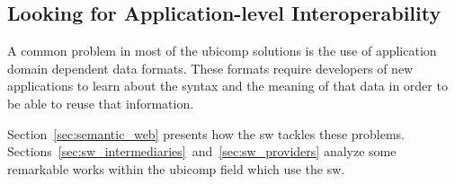 \subsection{Looking for Application-level Interoperability}
\label{sec:soa_sw}

A common problem in most of the \ac{ubicomp} solutions is the use of application domain dependent data formats.
These formats require developers of new applications to learn about the syntax and the meaning of that data in order to be able to reuse that information.

Section~\ref{sec:semantic_web} presents how the \acl{sw} tackles these problems.
Sections~\ref{sec:sw_intermediaries}~and~\ref{sec:sw_providers} analyze some remarkable works within the \ac{ubicomp} field which use the \ac{sw}.


